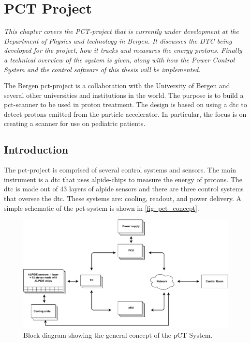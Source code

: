 \documentclass[main.tex]{subfiles}
\begin{document}
\section{PCT Project}
\textit{This chapter covers the PCT-project that is currently under development at the Department of Physics and technology in Bergen. It discusses the DTC being developed for the project, how it tracks and measures the energy protons. Finally a technical overview of the system is given, along with how the Power Control System and the control software of this thesis will be implemented.}

The Bergen \gls{pct}-project is a collaboration with the University of Bergen and several other universities and institutions in the world. The purpose is to build a \gls{pct}-scanner to be used in proton treatment. The design is based on using a \acrlong{dtc} to detect protons emitted from the particle accelerator. In particular, the focus is on creating a scanner for use on pediatric patients.


\subsection{Introduction}

The \gls{pct}-project is comprised of several control systems and sensors. The main instrument is a \gls{dtc} that uses \gls{alpide}-chips to measure the energy of protons. The \gls{dtc} is made out of 43 layers of \gls{alpide} sensors and there are three control systems that oversee the \gls{dtc}. These systems are: cooling, readout, and power delivery. A simple schematic of the \gls{pct}-system is shown in \autoref{fig: pct_concept}.

\begin{figure}[!ht]
    \centering
    \includegraphics[width=15cm]{images/dcs_concept_renewed.pdf}
    \caption{Block diagram showing the general concept of the pCT System.}
    \label{fig: pct_concept}
\end{figure}
\FloatBarrier
\end{document}
